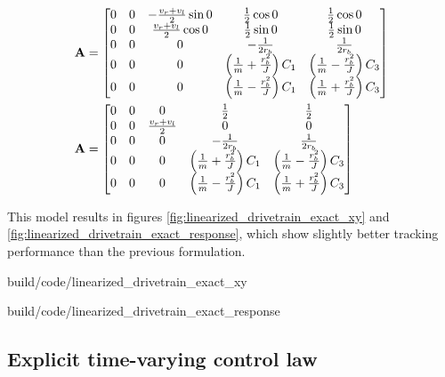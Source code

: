 \begin{align*}
  \mathbf{A} &=
  \begin{bmatrix}
    0 & 0 & -\frac{v_r + v_l}{2}\sin 0 & \frac{1}{2}\cos 0 &
      \frac{1}{2}\cos 0 \\
    0 & 0 & \frac{v_r + v_l}{2}\cos 0 & \frac{1}{2}\sin 0 &
      \frac{1}{2}\sin 0 \\
    0 & 0 & 0 & -\frac{1}{2r_b} & \frac{1}{2r_b} \\
    0 & 0 & 0 & \left(\frac{1}{m} + \frac{r_b^2}{J}\right) C_1 &
      \left(\frac{1}{m} - \frac{r_b^2}{J}\right) C_3 \\
    0 & 0 & 0 & \left(\frac{1}{m} - \frac{r_b^2}{J}\right) C_1 &
      \left(\frac{1}{m} + \frac{r_b^2}{J}\right) C_3
  \end{bmatrix} \\
  \mathbf{A} &=
  \begin{bmatrix}
    0 & 0 & 0 & \frac{1}{2} & \frac{1}{2} \\
    0 & 0 & \frac{v_r + v_l}{2} & 0 & 0 \\
    0 & 0 & 0 & -\frac{1}{2r_b} & \frac{1}{2r_b} \\
    0 & 0 & 0 & \left(\frac{1}{m} + \frac{r_b^2}{J}\right) C_1 &
      \left(\frac{1}{m} - \frac{r_b^2}{J}\right) C_3 \\
    0 & 0 & 0 & \left(\frac{1}{m} - \frac{r_b^2}{J}\right) C_1 &
      \left(\frac{1}{m} + \frac{r_b^2}{J}\right) C_3
  \end{bmatrix}
\end{align*}

This \gls{model} results in figures \ref{fig:linearized_drivetrain_exact_xy} and
\ref{fig:linearized_drivetrain_exact_response}, which show slightly better
tracking performance than the previous formulation.

\begin{bookfigure}
  \begin{minisvg}{build/code/linearized_drivetrain_exact_xy}
    \caption{Linearized drivetrain controller x-y plot}
    \label{fig:linearized_drivetrain_exact_xy}
  \end{minisvg}
  \hfill
  \begin{minisvg}{build/code/linearized_drivetrain_exact_response}
    \caption{Linearized drivetrain controller response}
    \label{fig:linearized_drivetrain_exact_response}
  \end{minisvg}
\end{bookfigure}

\subsection{Explicit time-varying control law}

